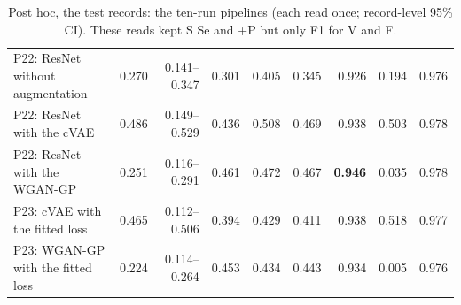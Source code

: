 \begin{table}[htbp]
{\begin{tabular}{lrrrrrrrr}
P22: ResNet without augmentation & 0.270 & 0.141--0.347 & 0.301 & 0.405 & 0.345 & 0.926 & 0.194 & 0.976 \\
P22: ResNet with the cVAE & 0.486 & 0.149--0.529 & 0.436 & 0.508 & 0.469 & 0.938 & 0.503 & 0.978 \\
P22: ResNet with the WGAN-GP & 0.251 & 0.116--0.291 & 0.461 & 0.472 & 0.467 & \textbf{0.946} & 0.035 & 0.978 \\
P23: cVAE with the fitted loss & 0.465 & 0.112--0.506 & 0.394 & 0.429 & 0.411 & 0.938 & 0.518 & 0.977 \\
P23: WGAN-GP with the fitted loss & 0.224 & 0.114--0.264 & 0.453 & 0.434 & 0.443 & 0.934 & 0.005 & 0.976 \\
\bottomrule
\end{tabular}}
\caption{Post hoc, the test records: the ten-run pipelines (each read once; record-level 95\% CI). These reads kept S Se and +P but only F1 for V and F.}\label{tab:all-posthoc}
\end{table}
